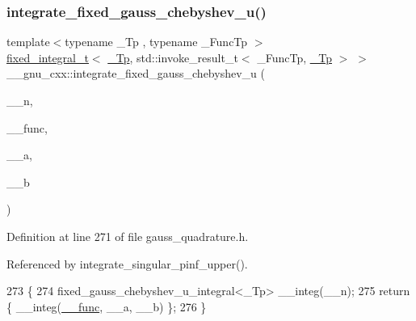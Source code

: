 \subsubsection{\texorpdfstring{integrate\+\_\+fixed\+\_\+gauss\+\_\+chebyshev\+\_\+u()}{integrate\_fixed\_gauss\_chebyshev\_u()}}
{\footnotesize\ttfamily template$<$typename \+\_\+\+Tp , typename \+\_\+\+Func\+Tp $>$ \\
\hyperlink{struct____gnu__cxx_1_1fixed__integral__t}{fixed\+\_\+integral\+\_\+t}$<$ \hyperlink{namespace____gnu__cxx_a3b19a9c800ca194374ef9172290f7d79}{\+\_\+\+Tp}, std\+::invoke\+\_\+result\+\_\+t$<$ \+\_\+\+Func\+Tp, \hyperlink{namespace____gnu__cxx_a3b19a9c800ca194374ef9172290f7d79}{\+\_\+\+Tp} $>$ $>$ \+\_\+\+\_\+gnu\+\_\+cxx\+::integrate\+\_\+fixed\+\_\+gauss\+\_\+chebyshev\+\_\+u (\begin{DoxyParamCaption}\item[{int}]{\+\_\+\+\_\+n,  }\item[{\+\_\+\+Func\+Tp}]{\+\_\+\+\_\+func,  }\item[{\hyperlink{namespace____gnu__cxx_a3b19a9c800ca194374ef9172290f7d79}{\+\_\+\+Tp}}]{\+\_\+\+\_\+a,  }\item[{\hyperlink{namespace____gnu__cxx_a3b19a9c800ca194374ef9172290f7d79}{\+\_\+\+Tp}}]{\+\_\+\+\_\+b }\end{DoxyParamCaption})}



Definition at line 271 of file gauss\+\_\+quadrature.\+h.



Referenced by integrate\+\_\+singular\+\_\+pinf\+\_\+upper().


\begin{DoxyCode}
273     \{
274       fixed\_gauss\_chebyshev\_u\_integral<\_Tp> \_\_integ(\_\_n);
275       \textcolor{keywordflow}{return} \{ \_\_integ(\hyperlink{namespace____gnu__cxx_af2b2f0c7a2ae72b922b1afefae5a65b2}{\_\_func}, \_\_a, \_\_b) \};
276     \}
\end{DoxyCode}
\mbox{\label{namespace____gnu__cxx_a1d79fed8d593be6c4c1f1cc2ecf92785}} 
